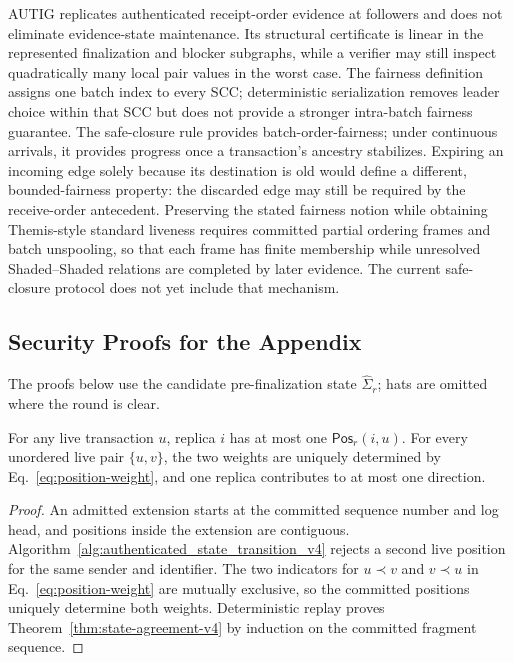 AUTIG replicates authenticated receipt-order evidence at followers and does
not eliminate evidence-state maintenance.  Its structural certificate is
linear in the represented finalization and blocker subgraphs, while a verifier
may still inspect quadratically many local pair values in the worst case.  The
fairness definition assigns one batch index to every SCC; deterministic
serialization removes leader choice within that SCC but does not provide a
stronger intra-batch fairness guarantee.  The safe-closure rule provides
batch-order-fairness; under continuous arrivals, it provides progress once a
transaction's ancestry stabilizes.  Expiring an incoming edge solely because
its destination is old would define a different, bounded-fairness property: the
discarded edge may still be required by the receive-order antecedent.  Preserving
the stated fairness notion while obtaining Themis-style standard liveness
requires committed partial ordering frames and batch unspooling, so that each
frame has finite membership while unresolved Shaded--Shaded relations are
completed by later evidence.  The current safe-closure protocol does not yet
include that mechanism.

\subsection{Security Proofs for the Appendix}
\label{app:autig-security-details-v4}

The proofs below use the candidate pre-finalization state
$\widehat\Sigma_r$; hats are omitted where the round is clear.

\begin{lemma}
\label{lem:position-uniqueness-v4}
For any live transaction $u$, replica $i$ has at most one
$\mathsf{Pos}_r(i,u)$.  For every unordered live pair $\{u,v\}$, the two
weights are uniquely determined by Eq.~\eqref{eq:position-weight}, and one
replica contributes to at most one direction.
\end{lemma}

\begin{proof}
An admitted extension starts at the committed sequence number and log head,
and positions inside the extension are contiguous.  Algorithm~\ref{alg:authenticated_state_transition_v4}
rejects a second live position for the same sender and identifier.  The two
indicators for $u\prec v$ and $v\prec u$ in Eq.~\eqref{eq:position-weight}
are mutually exclusive, so the committed positions uniquely determine both
weights.  Deterministic replay proves Theorem~\ref{thm:state-agreement-v4} by
induction on the committed fragment sequence.
\end{proof}

